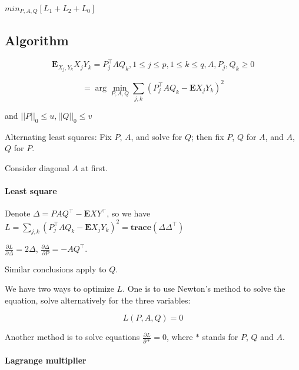\documentclass[12pt]{article}
\begin{document}
$min_{P, A, Q}{[ L_1 + L_2 + L_0 ]}$

\subsection{Algorithm}
\begin{equation}
\textbf{E}_{X_j,Y_k}{X_j Y_k} = P^\top_j A Q_k, 1\le j \le p, 1 \le k \le q, A, P_j, Q_k \ge 0
\end{equation}

\begin{equation}
[P, A, Q] = \arg \min_{P, A, Q} \sum_{j,k}(P_j^\top A Q_k - \textbf{E}X_j Y_k)^2
\end{equation}

and $||P||_0 \le u, ||Q||_0 \le v$

Alternating least squares: Fix $P$, $A$, and solve for $Q$; then fix $P$, $Q$ for $A$, and $A$, $Q$ for $P$.

Consider diagonal $A$ at first.

\paragraph{Least square}

Denote $\Delta = PAQ^\top - \textbf{E}XY^\top$, so we have $L = \sum_{j,k}(P_j^\top A Q_k - \textbf{E}X_j Y_k)^2 = \textbf{trace}({\Delta \Delta^\top})$

$\frac{\partial L}{\partial \Delta} = 2\Delta$, $\frac{\partial \Delta}{\partial P} = -AQ^\top$.

Similar conclusions apply to $Q$.

We have two ways to optimize $L$. One is to use Newton's method to solve the equation, solve alternatively for the three variables:

\begin{equation}
L(P, A, Q) = 0
\end{equation}

Another method is to solve equations $\frac{\partial L}{\partial \ast} = 0$, where $\ast$ stands for $P$, $Q$ and $A$.

\paragraph {Lagrange multiplier}
\end{document}
